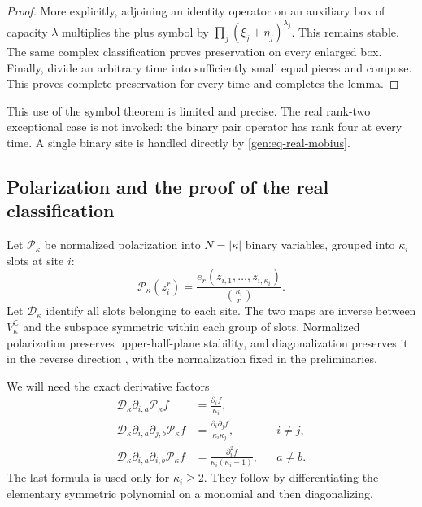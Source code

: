 \documentclass[reqno]{amsart}
\theoremstyle{definition}
\theoremstyle{remark}
\newcommand{\C}{\mathbb C}
\begin{document}
\begin{proof}
More explicitly, adjoining an identity operator on an auxiliary
box of capacity \(\lambda\) multiplies the plus symbol by
\(\prod_j(\xi_j+\eta_j)^{\lambda_j}\).  This remains stable.
The same complex classification proves preservation on every
enlarged box.  Finally, divide an arbitrary time into sufficiently
small equal pieces and compose.  This proves complete preservation
for every time and completes the lemma.
\end{proof}

This use of the symbol theorem is limited and precise.
The real rank-two exceptional case is not invoked: the binary
pair operator has rank four at every time.
A single binary site is handled directly by
\eqref{gen:eq-real-mobius}.

\subsection{Polarization and the proof of the real classification}
\label{gen:subsec-real-proof}

Let \(\mathcal P_\kappa\) be normalized polarization into
\(N=|\kappa|\) binary variables, grouped into \(\kappa_i\) slots at
site \(i\):
\[
 \mathcal P_\kappa(z_i^r)
 =\frac{e_r(z_{i,1},\ldots,z_{i,\kappa_i})}
             {\binom{\kappa_i}{r}}.
\]
Let \(\mathcal D_\kappa\) identify all slots belonging to each site.
The two maps are inverse between \(V_\kappa^\C\) and the subspace
symmetric within each group of slots.
Normalized polarization preserves upper-half-plane stability, and
diagonalization preserves it in the reverse direction
\cite[Proposition~2.4]{BB09}, with the normalization fixed in the preliminaries.

We will need the exact derivative factors
\begin{align}
 \mathcal D_\kappa\partial_{i,a}\mathcal P_\kappa f
 &=\frac{\partial_i f}{\kappa_i},
 \label{gen:eq-polar-one}\\
 \mathcal D_\kappa\partial_{i,a}\partial_{j,b}
                          \mathcal P_\kappa f
 &=\frac{\partial_i\partial_j f}{\kappa_i\kappa_j},
 &&i\neq j,
 \label{gen:eq-polar-cross}\\
 \mathcal D_\kappa\partial_{i,a}\partial_{i,b}
                          \mathcal P_\kappa f
 &=\frac{\partial_i^2f}{\kappa_i(\kappa_i-1)},
 &&a\neq b.
 \label{gen:eq-polar-same}
\end{align}
The last formula is used only for \(\kappa_i\geq2\).
They follow by differentiating the elementary symmetric polynomial
on a monomial and then diagonalizing.
\end{document}
